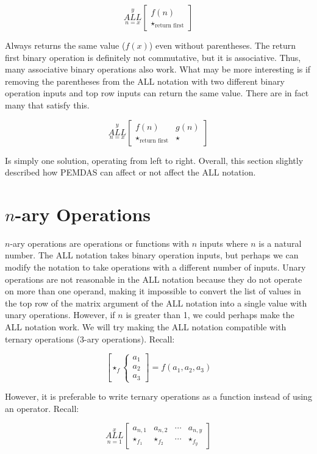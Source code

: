 \documentclass{article}
\begin{document}
$$\underset{n=x}{\overset{y}{ALL}}
\begin{bmatrix}
f(n) \\
\star_{\text{return first}}
\end{bmatrix}$$

Always returns the same value ($f(x)$) even without parentheses. The return first binary operation is definitely not commutative, but it is associative. Thus, many associative binary operations also work. What may be more interesting is if removing the parentheses from the ALL notation with two different binary operation inputs and top row inputs can return the same value. There are in fact many that satisfy this.

$$\underset{n=x}{\overset{y}{ALL}}
\begin{bmatrix}
f(n) & g(n) \\
\star_{\text{return first}} & \star
\end{bmatrix}$$

Is simply one solution, operating from left to right. Overall, this section slightly described how PEMDAS can affect or not affect the ALL notation.

\section{$n$-ary Operations}

$n$-ary operations are operations or functions with $n$ inputs where $n$ is a natural number. The ALL notation takes binary operation inputs, but perhaps we can modify the notation to take operations with a different number of inputs. Unary operations are not reasonable in the ALL notation because they do not operate on more than one operand, making it impossible to convert the list of values in the top row of the matrix argument of the ALL notation into a single value with unary operations. However, if $n$ is greater than 1, we could perhaps make the ALL notation work. We will try making the ALL notation compatible with ternary operations (3-ary operations). Recall:

$$\left[ \star_f \left\{ \begin{array}{rcl}
a_1 \\ a_2 \\ a_3 \end{array}\right. \right] = f(a_1,a_2,a_3)$$

However, it is preferable to write ternary operations as a function instead of using an operator. Recall:

$$\underset{n=1}{\overset{x}{ALL}} \begin{bmatrix}
a_{n,1} & a_{n,2} & \cdots & a_{n,y} \\
\star_{f_1} & \star_{f_2} & \cdots & \star_{f_y}
\end{bmatrix}$$
\end{document}
